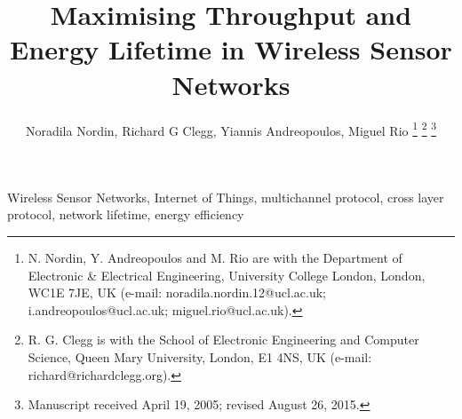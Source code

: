 \documentclass[journal]{IEEEtran}
\begin{document}
\title{Maximising Throughput and Energy Lifetime in Wireless Sensor Networks}

\author{Noradila Nordin,
        Richard G Clegg,
        Yiannis Andreopoulos,
        Miguel Rio%
\thanks{N. Nordin, Y. Andreopoulos and M. Rio are with the Department
of Electronic \& Electrical Engineering, University College London, London,
WC1E 7JE, UK (e-mail: noradila.nordin.12@ucl.ac.uk; i.andreopoulos@ucl.ac.uk; miguel.rio@ucl.ac.uk).}%
\thanks{R. G. Clegg is with the School of Electronic Engineering and Computer Science, Queen Mary University, London, E1 4NS, UK (e-mail: richard@richardclegg.org).}%
\thanks{Manuscript received April 19, 2005; revised August 26, 2015.}}



\maketitle




\begin{IEEEkeywords}
Wireless Sensor Networks, Internet of Things, multichannel protocol, cross layer protocol, network lifetime, energy efficiency
\end{IEEEkeywords}

\IEEEpeerreviewmaketitle




%




%




\label{references}


\end{document}
